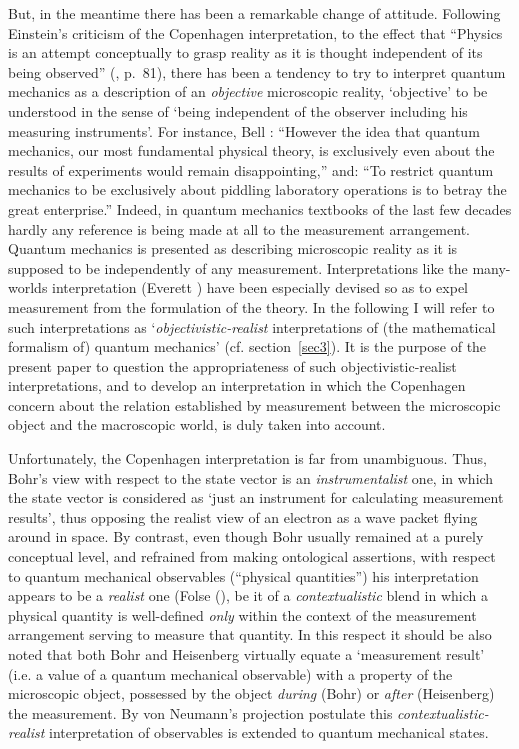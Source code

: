 \documentclass[12pt]{article}
\begin{document}
But, in the meantime there has been a remarkable change of
attitude. Following Einstein's criticism of the Copenhagen
interpretation, to the effect that ``Physics is an attempt
conceptually to grasp reality as it is thought independent of its
being observed'' (\cite{Einstein82a}, p.~81), there has been a
tendency to try to interpret quantum mechanics as a description of
an {\em objective} microscopic reality, `objective' to be
understood in the sense of `being independent of the observer
including his measuring instruments'. For instance, Bell
\cite{Bell90}: ``However the idea that quantum mechanics, our most
fundamental physical theory, is exclusively even about the results
of experiments would remain disappointing,'' and: ``To restrict
quantum mechanics to be exclusively about piddling laboratory
operations is to betray the great enterprise.'' Indeed, in quantum
mechanics textbooks of the last few decades hardly any reference
is being made at all to the measurement arrangement. Quantum
mechanics is presented as describing microscopic reality as it is
supposed to be independently of any measurement. Interpretations
like the many-worlds interpretation (Everett \cite{Ever73}) have
been especially devised so as to expel measurement from the
formulation of the theory. In the following I will refer to such
interpretations as `{\em objectivistic-realist} interpretations of
(the mathematical formalism of) quantum mechanics' (cf.
section~\ref{sec3}). It is the purpose of the present paper to
question the appropriateness of such objectivistic-realist
interpretations, and to develop an interpretation in which the
Copenhagen concern about the relation established by measurement
between the microscopic object and the macroscopic world, is duly
taken into account.

Unfortunately, the Copenhagen interpretation is far from
unambiguous. Thus, Bohr's view with respect to the state vector is
an {\em instrumentalist} one, in which the state vector is
considered as `just an instrument for calculating measurement
results', thus opposing the realist view of an electron as a wave
packet flying around in space. By contrast, even though Bohr
usually remained at a purely conceptual level, and refrained from
making ontological assertions, with respect to quantum mechanical
observables (``physical quantities'') his interpretation appears
to be a {\em realist} one (Folse (\cite{Folse85}), be it of a {\em
contextualistic} blend in which a physical quantity is
well-defined {\em only} within the context of the measurement
arrangement serving to measure that quantity. In this respect it
should be also noted that both Bohr and Heisenberg virtually
equate a `measurement result' (i.e. a value of a quantum
mechanical observable) with a property of the microscopic object,
possessed by the object {\em during} (Bohr) or {\em after}
(Heisenberg) the measurement. By von Neumann's projection
postulate this {\em contextualistic-realist} interpretation of
observables is extended to quantum mechanical states.
\end{document}
